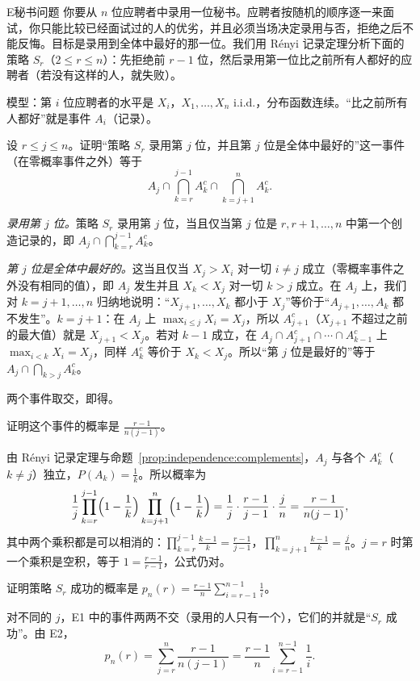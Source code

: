
\begin{probleme}{E}{秘书问题}
你要从 $n$ 位应聘者中录用一位秘书。应聘者按随机的顺序逐一来面试，你只能比较已经面试过的人的优劣，并且必须当场决定录用与否，拒绝之后不能反悔。目标是录用到全体中最好的那一位。我们用 Rényi 记录定理分析下面的策略 $S_r$（$2\leqslant r\leqslant n$）：先拒绝前 $r-1$ 位，然后录用第一位比之前所有人都好的应聘者（若没有这样的人，就失败）。

模型：第 $i$ 位应聘者的水平是 $X_i$，$X_1,\dots,X_n$ i.i.d.，分布函数连续。“比之前所有人都好”就是事件 $A_i$（记录）。
\begin{questions}
\item 设 $r\leqslant j\leqslant n$。证明“策略 $S_r$ 录用第 $j$ 位，并且第 $j$ 位是全体中最好的”这一事件（在零概率事件之外）等于
\[
A_j\cap\bigcap_{k=r}^{j-1}A_k^c\cap\bigcap_{k=j+1}^nA_k^c .
\]
\begin{solution}
\emph{录用第 $j$ 位。}策略 $S_r$ 录用第 $j$ 位，当且仅当第 $j$ 位是 $r,r+1,\dots,n$ 中第一个创造记录的，即 $A_j\cap\bigcap_{k=r}^{j-1}A_k^c$。

\emph{第 $j$ 位是全体中最好的。}这当且仅当 $X_j>X_i$ 对一切 $i\neq j$ 成立（零概率事件之外没有相同的值），即 $A_j$ 发生并且 $X_k<X_j$ 对一切 $k>j$ 成立。在 $A_j$ 上，我们对 $k=j+1,\dots,n$ 归纳地说明：“$X_{j+1},\dots,X_k$ 都小于 $X_j$”等价于“$A_{j+1},\dots,A_k$ 都不发生”。$k=j+1$：在 $A_j$ 上 $\max_{i\leqslant j}X_i=X_j$，所以 $A_{j+1}^c$（$X_{j+1}$ 不超过之前的最大值）就是 $X_{j+1}<X_j$。若对 $k-1$ 成立，在 $A_j\cap A_{j+1}^c\cap\cdots\cap A_{k-1}^c$ 上 $\max_{i<k}X_i=X_j$，同样 $A_k^c$ 等价于 $X_k<X_j$。所以“第 $j$ 位是最好的”等于 $A_j\cap\bigcap_{k>j}A_k^c$。

两个事件取交，即得。
\end{solution}

\item 证明这个事件的概率是 $\frac{r-1}{n(j-1)}$。
\begin{solution}
由 Rényi 记录定理与命题~\ref{prop:independence:complements}，$A_j$ 与各个 $A_k^c$（$k\neq j$）独立，$P(A_k)=\frac1k$。所以概率为
\[
\frac1j\prod_{k=r}^{j-1}\Bigl(1-\frac1k\Bigr)\prod_{k=j+1}^n\Bigl(1-\frac1k\Bigr)=\frac1j\cdot\frac{r-1}{j-1}\cdot\frac jn=\frac{r-1}{n(j-1)},
\]
其中两个乘积都是可以相消的：$\prod_{k=r}^{j-1}\frac{k-1}k=\frac{r-1}{j-1}$，$\prod_{k=j+1}^n\frac{k-1}k=\frac jn$。$j=r$ 时第一个乘积是空积，等于 $1=\frac{r-1}{r-1}$，公式仍对。
\end{solution}

\item 证明策略 $S_r$ 成功的概率是 $p_n(r)=\frac{r-1}n\sum_{i=r-1}^{n-1}\frac1i$。
\begin{solution}
对不同的 $j$，E1 中的事件两两不交（录用的人只有一个），它们的并就是“$S_r$ 成功”。由 E2，
\[
p_n(r)=\sum_{j=r}^n\frac{r-1}{n(j-1)}=\frac{r-1}n\sum_{i=r-1}^{n-1}\frac1i .
\]
\end{solution}


\end{questions}
\end{probleme}
